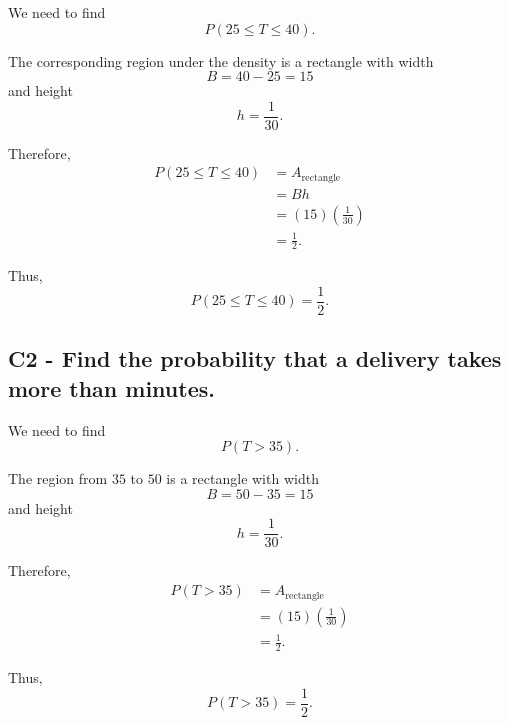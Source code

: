 {	We need to find
	\[
	P(25\le T\le40).
	\]
	
	The corresponding region under the density is a rectangle with width
	\[
	B=40-25=15
	\]
	and height
	\[
	h=\frac{1}{30}.
	\]
	
	Therefore,
	\[
	\begin{aligned}
		P(25\le T\le40)
		&=A_{\text{rectangle}}\\
		&=Bh\\
		&=(15)\left(\frac{1}{30}\right)\\
		&=\frac{1}{2}.
	\end{aligned}
	\]
	
	Thus,
	\[
	P(25\le T\le40)=\frac{1}{2}.
	\]
	

	\label{subsec:uniform-delivery-time-c2-c}
	\subsection*{C2 - Find the probability that a delivery takes more than  minutes. }
	
	We need to find
	\[
	P(T>35).
	\]
	
	The region from $35$ to $50$ is a rectangle with width
	\[
	B=50-35=15
	\]
	and height
	\[
	h=\frac{1}{30}.
	\]
	
	Therefore,
	\[
	\begin{aligned}
		P(T>35)
		&=A_{\text{rectangle}}\\
		&=(15)\left(\frac{1}{30}\right)\\
		&=\frac{1}{2}.
	\end{aligned}
	\]
	
	Thus,
	\[
	P(T>35)=\frac{1}{2}.
	\]
	

	}

